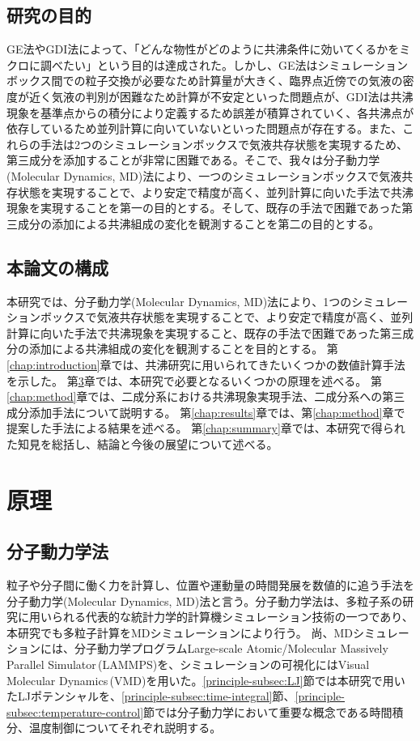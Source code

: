 \documentclass[titlepage]{jsreport}
\begin{document}
\section{研究の目的} \label{introduction:purpose}
GE法やGDI法によって、「どんな物性がどのように共沸条件に効いてくるかをミクロに調べたい」という目的は達成された。しかし、GE法はシミュレーションボックス間での粒子交換が必要なため計算量が大きく、臨界点近傍での気液の密度が近く気液の判別が困難なため計算が不安定といった問題点が、GDI法は共沸現象を基準点からの積分により定義するため誤差が積算されていく、各共沸点が依存しているため並列計算に向いていないといった問題点が存在する。また、これらの手法は2つのシミュレーションボックスで気液共存状態を実現するため、第三成分を添加することが非常に困難である。そこで、我々は分子動力学(Molecular Dynamics, MD)法\cite{molecular-dynamics}により、一つのシミュレーションボックスで気液共存状態を実現することで、より安定で精度が高く、並列計算に向いた手法で共沸現象を実現することを第一の目的とする。そして、既存の手法で困難であった第三成分の添加による共沸組成の変化を観測することを第二の目的とする。


\section{本論文の構成} \label{introduction:constitution}
本研究では、分子動力学(Molecular Dynamics, MD)法により、1つのシミュレーションボックスで気液共存状態を実現することで、より安定で精度が高く、並列計算に向いた手法で共沸現象を実現すること、既存の手法で困難であった第三成分の添加による共沸組成の変化を観測することを目的とする。
第\ref{chap:introduction}章では、共沸研究に用いられてきたいくつかの数値計算手法を示した。
第\ref{chap:principle}章では、本研究で必要となるいくつかの原理を述べる。
第\ref{chap:method}章では、二成分系における共沸現象実現手法、二成分系への第三成分添加手法について説明する。
第\ref{chap:results}章では、第\ref{chap:method}章で提案した手法による結果を述べる。
第\ref{chap:summary}章では、本研究で得られた知見を総括し、結論と今後の展望について述べる。


\chapter{原理} \label{chap:principle}
\section{分子動力学法}\label{principle-sec:molecular-dynamics}
粒子や分子間に働く力を計算し、位置や運動量の時間発展を数値的に追う手法を分子動力学(Molecular Dynamics, MD)法と言う。分子動力学法は、多粒子系の研究に用いられる代表的な統計力学的計算機シミュレーション技術の一つであり\cite{molecular-dynamics-many-molecules}、本研究でも多粒子計算をMDシミュレーションにより行う。
尚、MDシミュレーションには、分子動力学プログラムLarge-scale Atomic/Molecular Massively Parallel Simulator\,(LAMMPS)\cite{lammps}を、シミュレーションの可視化にはVisual Molecular Dynamics\,(VMD)\cite{vmd}を用いた。\ref{principle-subsec:LJ}節では本研究で用いたLJポテンシャルを、\ref{principle-subsec:time-integral}節、\ref{principle-subsec:temperature-control}節では分子動力学において重要な概念である時間積分、温度制御についてそれぞれ説明する。
\end{document}
